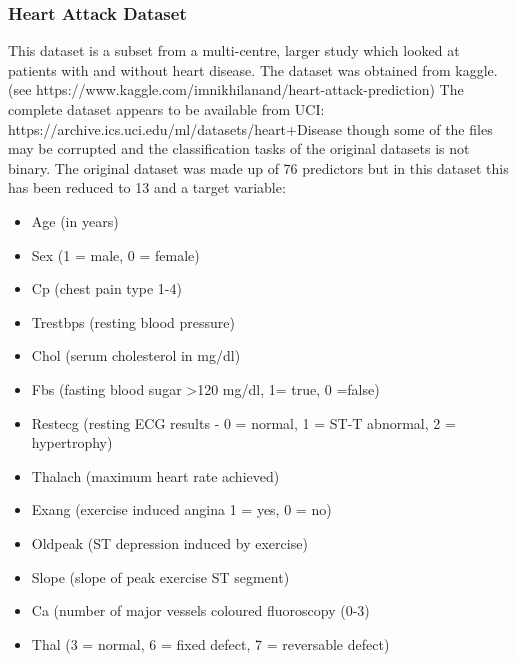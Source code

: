 \subsubsection{Heart Attack Dataset}
This dataset is a subset from a multi-centre, larger study which looked at patients with and without heart disease. The dataset was obtained from kaggle.\newline 
(see https://www.kaggle.com/imnikhilanand/heart-attack-prediction) \newline
The complete dataset appears to be available from UCI:\newline
https://archive.ics.uci.edu/ml/datasets/heart+Disease \newline 
though some of the files may be corrupted and the classification tasks of the original datasets is not binary.
The original dataset was made up of 76 predictors but in this dataset this has been reduced to 13 and a target variable:
\begin{itemize}
    \item Age (in years)
    \item Sex (1 = male, 0 = female) 
    \item Cp (chest pain type 1-4)
    \item Trestbps (resting blood pressure)
    \item Chol (serum cholesterol in mg/dl) 
    \item Fbs (fasting blood sugar >120 mg/dl, 1= true, 0 =false) 
    \item Restecg (resting ECG results - 0 = normal, 1 = ST-T abnormal, 2 = hypertrophy)
    \item Thalach (maximum heart rate achieved)
    \item Exang (exercise induced angina 1 = yes, 0 = no)
    \item Oldpeak (ST depression induced by exercise)
    \item Slope (slope of peak exercise ST segment)
    \item Ca (number of major vessels coloured fluoroscopy (0-3) 
    \item Thal (3 = normal, 6 = fixed defect, 7 = reversable defect) 
\end{itemize}

